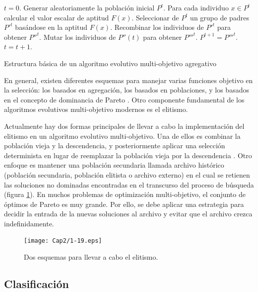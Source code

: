   \begin{algorithm}
      \begin{algorithmic}[1]			
	\STATE $t=0$.
	\STATE Generar aleatoriamente la poblaci\'on inicial $P^t$.
	\STATE Para cada individuo $x \in P^t$ calcular el valor escalar de aptitud $F(x)$.
	\STATE Seleccionar de $P^t$ un grupo de padres $P'^t$ bas\'andose en la aptitud $F(x)$.
	\STATE Recombinar los individuos de $P'^t$ para obtener $P''^t.$
	\STATE Mutar los individuos de $P''(t)$ para obtener $P'''^t$.
	\STATE $P^{t+1 } = P'''^t$.
	\STATE $t=t+1$.
	\ENDWHILE 
  \end{algorithmic}
  \caption{Estructura b\'asica de un algoritmo evolutivo multi-objetivo agregativo}
  \label{alg:AEb}
  \end{algorithm}

  En general, existen diferentes esquemas para manejar varias funciones objetivo en la selecci\'on: los basados en agregaci\'on, los basados 
  en poblaciones, y los basados en el concepto de dominancia de Pareto \cite{Zitzler99}. Otro componente fundamental de los algoritmos
  evolutivos multi-objetivo modernos es el elitismo.

  Actualmente hay dos formas principales de llevar a cabo la implementaci\'on del elitismo en un algoritmo evolutivo multi-objetivo.
  Una de ellos es combinar la poblaci\'on vieja y la descendencia, y posteriormente aplicar una selecci\'on determinista 
  en lugar de reemplazar la poblaci\'on vieja por la descendencia \cite{deb02}. Otro enfoque es mantener una poblaci\'on secundaria 
  llamada archivo hist\'orico (poblaci\'on secundaria, poblaci\'on elitista o archivo externo) en el cual se retienen las soluciones no 
  dominadas encontradas en el transcurso del proceso de b\'usqueda \cite{Zitzler99}(figura \ref{fig:elitismo}). En muchos problemas 
  de optimizaci\'on multi-objetivo, el conjunto de \'optimos de Pareto es muy grande. Por ello, se debe aplicar una estrategia para decidir la entrada 
  de la nuevas soluciones al archivo y evitar que el archivo crezca indefinidamente.
  
    \begin{figure}[H]
	\centering
	\texttt{[image: Cap2/1-19.eps]}
	  \caption{Dos esquemas para llevar a cabo el elitismo.}
      \label{fig:elitismo}
      \end{figure}
  
  \subsection{Clasificaci\'on}
  

